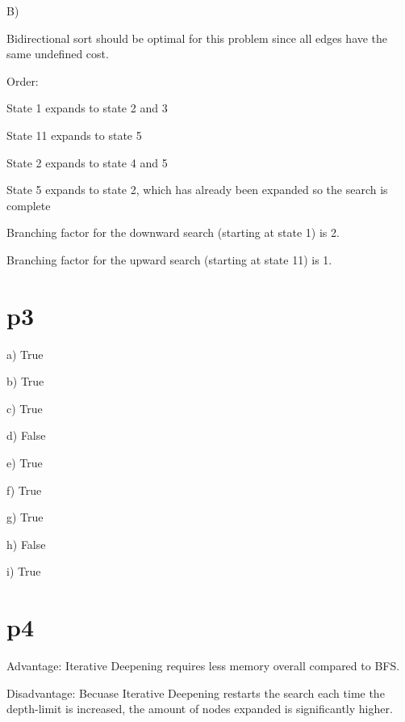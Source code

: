 \documentclass{article}
\begin{document}
\hspace{5mm}

B)

Bidirectional sort should be optimal for this problem since all edges have the same undefined cost.
\newline

Order:

State 1 expands to state 2 and 3

State 11 expands to state 5

State 2 expands to state 4 and 5

State 5 expands to state 2, which has already been expanded so the search is complete
\newline


Branching factor for the downward search (starting at state 1) is 2.

Branching factor for the upward search (starting at state 11) is 1.

\section*{p3}

\hspace{5mm}

a) True



b) True



c) True



d) False


e) True



f) True



g) True




h) False



i) True

\section*{p4}

\hspace{5mm}

Advantage: Iterative Deepening requires less memory overall compared to BFS.

Disadvantage: Becuase Iterative Deepening restarts the search each time the depth-limit is increased, the amount of nodes expanded is significantly higher.
\end{document}

